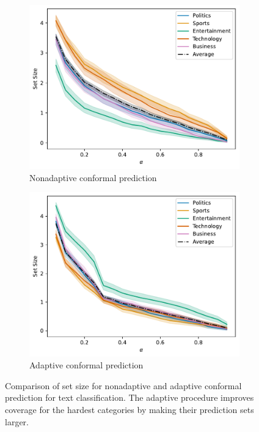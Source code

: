 \documentclass[a4paper, 12pt]{article}
\begin{document}
\begin{figure}[ht]
    \centering
    \begin{subfigure}[b]{0.8\linewidth}
        \includegraphics[width=\linewidth]{figures/nonadaptive_set_size.pdf}
        \caption{Nonadaptive conformal prediction}
        \label{fig:nonadaptive_set_size}
    \end{subfigure}
    \begin{subfigure}[b]{0.8\linewidth}
        \includegraphics[width=\linewidth]{figures/adaptive_set_size.pdf}
        \caption{Adaptive conformal prediction}
        \label{fig:adaptive_set_size}
    \end{subfigure}
    \caption{Comparison of set size for nonadaptive and adaptive conformal prediction for text classification. The adaptive procedure improves coverage for the hardest categories by making their prediction sets larger.}
    \label{fig:set_size}
\end{figure}



\newpage
\printbibliography %
\end{document}
